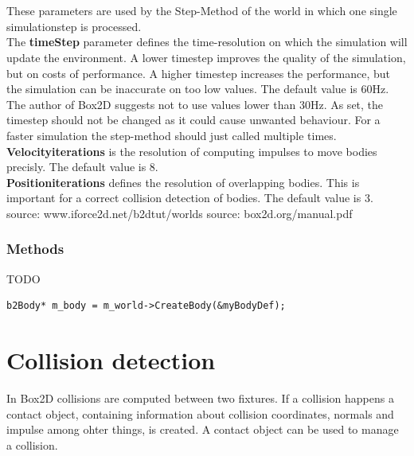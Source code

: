 \documentclass[10pt,a4paper,DIV=11]{scrreprt}
\begin{document}
   \\
\\

These parameters are used by the Step-Method of the world in which one single simulationstep is processed. \\

The \textbf{timeStep} parameter defines the time-resolution on which the simulation will update the environment. A lower timestep improves the quality of the simulation, but on costs of performance. A higher timestep increases the performance, but the simulation can be inaccurate on too low values.
The default value is 60Hz. The author of Box2D suggests not to use values lower than 30Hz. As set, the timestep should not be changed as it could cause unwanted behaviour. For a faster simulation the step-method should just called multiple times. \\


\textbf{Velocityiterations} is the resolution of computing impulses to move bodies precisly. The default value is 8. \\

\textbf{Positioniterations} defines the resolution of overlapping bodies. This is important for a correct collision detection of bodies. The default value is 3. \\


source: www.iforce2d.net/b2dtut/worlds
source: box2d.org/manual.pdf

\subsubsection*{Methods}
TODO
\begin{lstlisting}[caption={World creates a body},label=lst:world-body]
b2Body* m_body = m_world->CreateBody(&myBodyDef);
\end{lstlisting}

\section{Collision detection}
In Box2D collisions are computed between two fixtures. If a collision happens a contact object, containing information about collision coordinates, normals and impulse among ohter things, is created. A contact object can be used to manage a collision.
\end{document}
